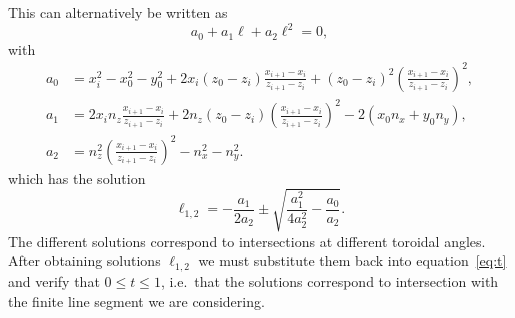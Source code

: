 \documentclass{notes}
\begin{document}
	This can alternatively be written as
	\begin{equation}
		a_0 + a_1\ell + a_2\ell^2 = 0,
	\end{equation}
	with
	\begin{equation}
		\begin{aligned}
			a_0 &= 
				x_i^2 - x_0^2 - y_0^2 +
				2x_i\left(z_0-z_i\right)\frac{x_{i+1}-x_i}{z_{i+1}-z_i} +
				\left(z_0-z_i\right)^2\left(\frac{x_{i+1}-x_i}{z_{i+1}-z_i}\right)^2,\\
			a_1 &=
				2x_in_z\frac{x_{i+1}-x_i}{z_{i+1}-z_i} +
				2n_z\left(z_0-z_i\right)\left(
					\frac{x_{i+1}-x_i}{z_{i+1}-z_i}
				\right)^2 -
				2\left(x_0n_x + y_0n_y\right),\\
			a_2 &=
				n_z^2\left(
					\frac{x_{i+1}-x_i}{z_{i+1}-z_i}
				\right)^2 -
				n_x^2 - n_y^2.
		\end{aligned}
	\end{equation}
	which has the solution
	\begin{equation}
		\ell_{1,2} = -\frac{a_1}{2a_2}\pm \sqrt{\frac{a_1^2}{4a_2^2} - \frac{a_0}{a_2}}.
	\end{equation}
	The different solutions correspond to intersections at different toroidal
	angles. After obtaining solutions $\ell_{1,2}$ we must substitute them back
	into equation~\eqref{eq:t} and verify that $0\leq t\leq 1$, i.e.\ that the
	solutions correspond to intersection with the finite line segment we are
	considering.
\end{document}

